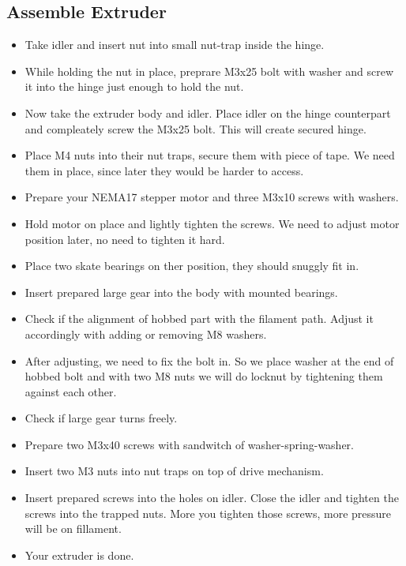 \documentclass[11pt]{article}
\begin{document}
\subsection{Assemble Extruder}
\begin{itemize}
\item Take idler and insert nut into small nut-trap inside the hinge.
\item While holding the nut in place, preprare M3x25 bolt with washer and screw it into the hinge just enough to hold the nut.
\item Now take the extruder body and idler. Place idler on the hinge counterpart and compleately screw the M3x25 bolt. This will create secured hinge.
\item Place M4 nuts into their nut traps, secure them with piece of tape. We need them in place, since later they would be harder to access.
\item Prepare your NEMA17 stepper motor and three M3x10 screws with washers.
\item Hold motor on place and lightly tighten the screws. We need to adjust motor position later, no need to tighten it hard.
\item Place two skate bearings on ther position, they should snuggly fit in.
\item Insert prepared large gear into the body with mounted bearings.
\item Check if the alignment of hobbed part with the filament path. Adjust it accordingly with adding or removing M8 washers.
\item After adjusting, we need to fix the bolt in. So we place washer at the end of hobbed bolt and with two M8 nuts we will do locknut by tightening them against each other.
\item Check if large gear turns freely.
\item Prepare two M3x40 screws with sandwitch of washer-spring-washer.
\item Insert two M3 nuts into nut traps on top of drive mechanism.
\item Insert prepared screws into the holes on idler. Close the idler and tighten the screws into the trapped nuts. More you tighten those screws, more pressure will be on fillament.
\item Your extruder is done.
\end{itemize}
\newpage
\end{document}
